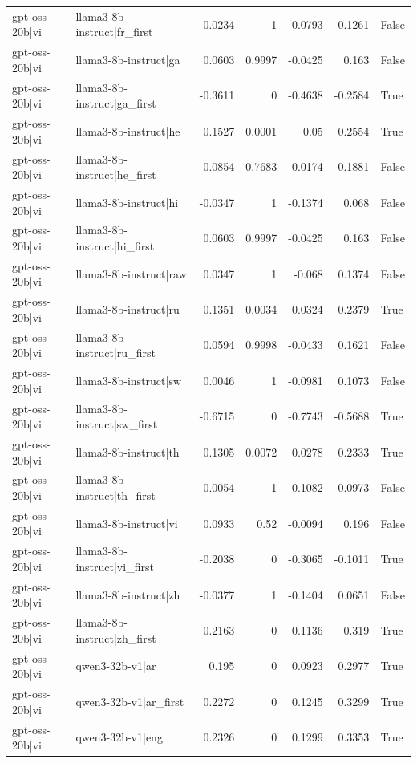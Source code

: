 \begin{table}
\begin{tabular}{l l r r r r l}
gpt-oss-20b|vi & llama3-8b-instruct|fr_first & 0.0234 & 1 & -0.0793 & 0.1261 & False \\
gpt-oss-20b|vi & llama3-8b-instruct|ga & 0.0603 & 0.9997 & -0.0425 & 0.163 & False \\
gpt-oss-20b|vi & llama3-8b-instruct|ga_first & -0.3611 & 0 & -0.4638 & -0.2584 & True \\
gpt-oss-20b|vi & llama3-8b-instruct|he & 0.1527 & 0.0001 & 0.05 & 0.2554 & True \\
gpt-oss-20b|vi & llama3-8b-instruct|he_first & 0.0854 & 0.7683 & -0.0174 & 0.1881 & False \\
gpt-oss-20b|vi & llama3-8b-instruct|hi & -0.0347 & 1 & -0.1374 & 0.068 & False \\
gpt-oss-20b|vi & llama3-8b-instruct|hi_first & 0.0603 & 0.9997 & -0.0425 & 0.163 & False \\
gpt-oss-20b|vi & llama3-8b-instruct|raw & 0.0347 & 1 & -0.068 & 0.1374 & False \\
gpt-oss-20b|vi & llama3-8b-instruct|ru & 0.1351 & 0.0034 & 0.0324 & 0.2379 & True \\
gpt-oss-20b|vi & llama3-8b-instruct|ru_first & 0.0594 & 0.9998 & -0.0433 & 0.1621 & False \\
gpt-oss-20b|vi & llama3-8b-instruct|sw & 0.0046 & 1 & -0.0981 & 0.1073 & False \\
gpt-oss-20b|vi & llama3-8b-instruct|sw_first & -0.6715 & 0 & -0.7743 & -0.5688 & True \\
gpt-oss-20b|vi & llama3-8b-instruct|th & 0.1305 & 0.0072 & 0.0278 & 0.2333 & True \\
gpt-oss-20b|vi & llama3-8b-instruct|th_first & -0.0054 & 1 & -0.1082 & 0.0973 & False \\
gpt-oss-20b|vi & llama3-8b-instruct|vi & 0.0933 & 0.52 & -0.0094 & 0.196 & False \\
gpt-oss-20b|vi & llama3-8b-instruct|vi_first & -0.2038 & 0 & -0.3065 & -0.1011 & True \\
gpt-oss-20b|vi & llama3-8b-instruct|zh & -0.0377 & 1 & -0.1404 & 0.0651 & False \\
gpt-oss-20b|vi & llama3-8b-instruct|zh_first & 0.2163 & 0 & 0.1136 & 0.319 & True \\
gpt-oss-20b|vi & qwen3-32b-v1|ar & 0.195 & 0 & 0.0923 & 0.2977 & True \\
gpt-oss-20b|vi & qwen3-32b-v1|ar_first & 0.2272 & 0 & 0.1245 & 0.3299 & True \\
gpt-oss-20b|vi & qwen3-32b-v1|eng & 0.2326 & 0 & 0.1299 & 0.3353 & True \\

\end{tabular}
\end{table}
